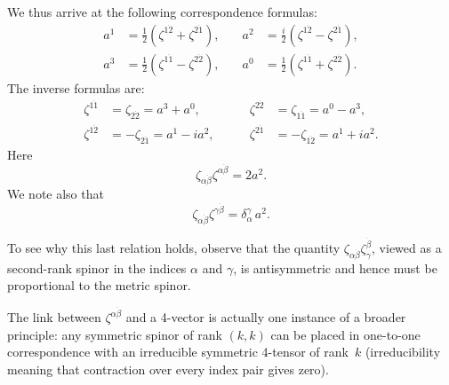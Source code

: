 We thus arrive at the following correspondence formulas:
\begin{equation}
\begin{aligned}
a^1 &= \tfrac{1}{2}(\zeta^{1\dot 2} + \zeta^{2\dot 1}), &\quad a^2 &= \tfrac{i}{2}(\zeta^{1\dot 2} - \zeta^{2\dot 1}),\\
a^3 &= \tfrac{1}{2}(\zeta^{1\dot 1} - \zeta^{2\dot 2}), &\quad a^0 &= \tfrac{1}{2}(\zeta^{1\dot 1} + \zeta^{2\dot 2}).
\end{aligned}
\tag{18.1}
\end{equation}
The inverse formulas are:
\begin{equation}
\begin{aligned}
\zeta^{1\dot 1} &= \zeta_{2\dot 2} = a^3 + a^0, &\qquad \zeta^{2\dot 2} &= \zeta_{1\dot 1} = a^0 - a^3,\\
\zeta^{1\dot 2} &= -\zeta_{2\dot 1} = a^1 - ia^2, &\qquad \zeta^{2\dot 1} &= -\zeta_{1\dot 2} = a^1 + ia^2.
\end{aligned}
\tag{18.2}
\end{equation}
Here
\begin{equation}
\zeta_{\alpha\dot\beta}\zeta^{\alpha\dot\beta} = 2a^2.
\tag{18.3}
\end{equation}
We note also that
\begin{equation}
\zeta_{\alpha\dot\beta}\zeta^{\gamma\dot\beta} = \delta^\gamma_\alpha\, a^2.
\tag{18.4}
\end{equation}

To see why this last relation holds, observe that the quantity $\zeta_{\alpha\dot\beta}\zeta^{\dot\beta}_\gamma$, viewed as a second-rank spinor in the indices $\alpha$ and $\gamma$, is antisymmetric and hence must be proportional to the metric spinor.

The link between $\zeta^{\alpha\dot\beta}$ and a 4-vector is actually one instance of a broader principle: any symmetric spinor of rank $(k, k)$ can be placed in one-to-one correspondence with an irreducible symmetric 4-tensor of rank~$k$ (irreducibility meaning that contraction over every index pair gives zero).

